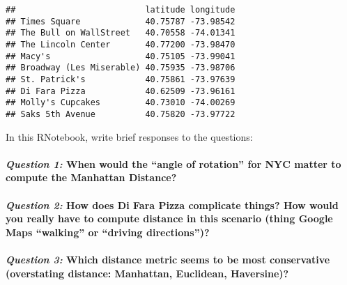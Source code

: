 \documentclass[
]{article}
\begin{document}
\begin{verbatim}
##                          latitude longitude
## Times Square             40.75787 -73.98542
## The Bull on WallStreet   40.70558 -74.01341
## The Lincoln Center       40.77200 -73.98470
## Macy's                   40.75105 -73.99041
## Broadway (Les Miserable) 40.75935 -73.98706
## St. Patrick's            40.75861 -73.97639
## Di Fara Pizza            40.62509 -73.96161
## Molly's Cupcakes         40.73010 -74.00269
## Saks 5th Avenue          40.75820 -73.97722
\end{verbatim}

In this RNotebook, write brief responses to the questions:

\hypertarget{question-1-when-would-the-angle-of-rotation-for-nyc-matter-to-compute-the-manhattan-distance}{%
\paragraph{\texorpdfstring{\emph{Question 1:} When would the ``angle of
rotation'' for NYC matter to compute the Manhattan
Distance?}{Question 1: When would the ``angle of rotation'' for NYC matter to compute the Manhattan Distance?}}\label{question-1-when-would-the-angle-of-rotation-for-nyc-matter-to-compute-the-manhattan-distance}}

\hypertarget{question-2-how-does-di-fara-pizza-complicate-things-how-would-you-really-have-to-compute-distance-in-this-scenario-thing-google-maps-walking-or-driving-directions}{%
\paragraph{\texorpdfstring{\emph{Question 2:} How does Di Fara Pizza
complicate things? How would you really have to compute distance in this
scenario (thing Google Maps ``walking'' or ``driving
directions'')?}{Question 2: How does Di Fara Pizza complicate things? How would you really have to compute distance in this scenario (thing Google Maps ``walking'' or ``driving directions'')?}}\label{question-2-how-does-di-fara-pizza-complicate-things-how-would-you-really-have-to-compute-distance-in-this-scenario-thing-google-maps-walking-or-driving-directions}}

\hypertarget{question-3-which-distance-metric-seems-to-be-most-conservative-overstating-distance-manhattan-euclidean-haversine}{%
\paragraph{\texorpdfstring{\emph{Question 3:} Which distance metric
seems to be most conservative (overstating distance: Manhattan,
Euclidean,
Haversine)?}{Question 3: Which distance metric seems to be most conservative (overstating distance: Manhattan, Euclidean, Haversine)?}}\label{question-3-which-distance-metric-seems-to-be-most-conservative-overstating-distance-manhattan-euclidean-haversine}}
\end{document}
